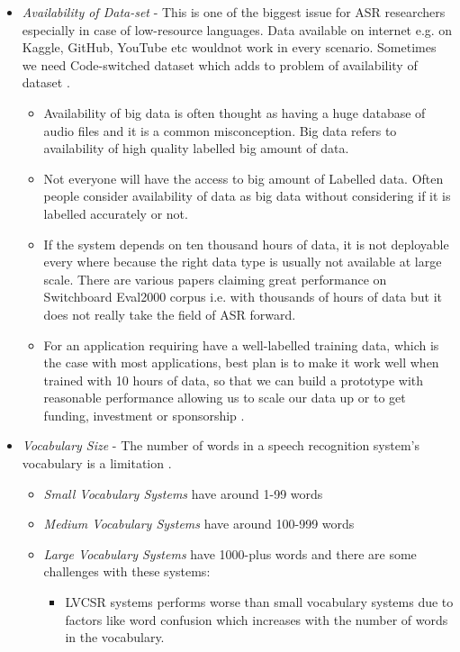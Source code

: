 \begin{itemize}
    \item \textit{Availability of Data-set} - This is one of the biggest issue for ASR researchers especially in case of low-resource languages. Data available on internet e.g. on Kaggle, GitHub, YouTube etc wouldnot work in every scenario. Sometimes we need Code-switched dataset which adds to problem of availability of dataset \cite{besacier_automatic_2014}.
    \begin{itemize}
        \item Availability of big data is often thought as having a huge database of audio files and it is a common misconception. Big data refers to availability of high quality labelled big amount of data. 
        \item Not everyone will have the access to big amount of Labelled data. Often people consider availability of data as big data without considering if it is labelled accurately or not.  
        \item If the system depends on ten thousand hours of data, it is not deployable every where because the right data type is usually not available at large scale. There are various papers claiming great performance on Switchboard Eval2000 corpus i.e. with thousands of hours of data but it does not really take the field of ASR forward. 
        \item For an application requiring have a well-labelled training data, which is the case with most applications, best plan is to make it work well when trained with 10 hours of data, so that we can build a prototype with reasonable performance allowing us to scale our data up or to get funding, investment or sponsorship \cite{kincaid_state_2018}.
    \end{itemize}   
    \item \textit{Vocabulary Size} - The number of words in a speech recognition system's vocabulary is a limitation \cite{zhang_strategies_2019}. 
    \begin{itemize}
        \item \textit{Small Vocabulary Systems} have around 1-99 words
        \item \textit{Medium Vocabulary Systems} have around 100-999 words
        \item \textit{Large Vocabulary Systems} have 1000-plus words and there are some challenges with these systems: 
        \begin{itemize}
            \item LVCSR systems performs worse than small vocabulary systems due to factors like word confusion which increases with the number of words in the vocabulary. 

\end{itemize}
\end{itemize}
\end{itemize}
